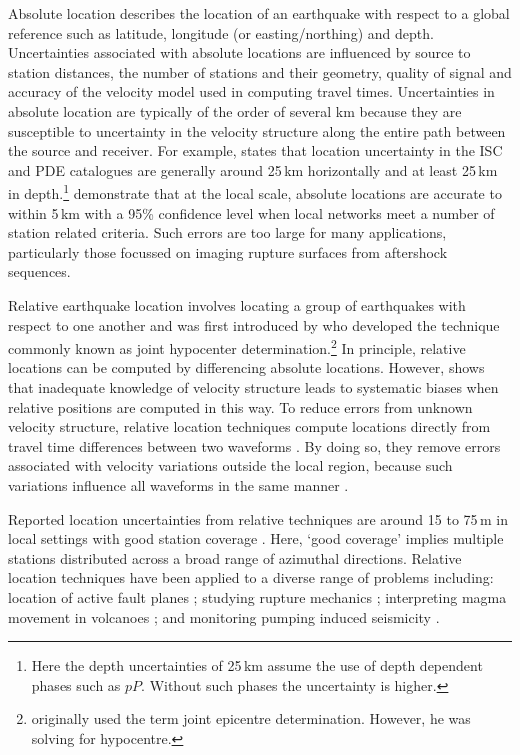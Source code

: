 \documentclass[extra]{gji}
\begin{document}
Absolute location describes the location of an earthquake with
respect to a global reference such as latitude, longitude (or
easting/northing) and depth. Uncertainties associated with absolute
locations are influenced by source to station distances, the number
of stations and their geometry, quality of signal and accuracy of
the velocity model used in computing travel times. Uncertainties in
absolute location are typically of the order of several km because
they are susceptible to uncertainty in the velocity structure along
the entire path between the source and receiver. For example,
\citet{dr_Shearer99a} states that location uncertainty in the ISC
and PDE catalogues are generally around 25\,km horizontally and at
least 25\,km in depth.\footnote{Here the depth uncertainties of
25\,km assume the use of depth dependent phases such as $pP$.
Without such phases the uncertainty is higher.}
\citet{dr_Bondar04a} demonstrate that at the local scale, absolute
locations are accurate to within 5\,km with a 95\% confidence level
when local networks meet a number of station related criteria. Such
errors are too large for many applications, particularly those
focussed on imaging rupture surfaces from aftershock sequences.

Relative earthquake location involves locating a group of
earthquakes with respect to one another and was first introduced by
\citet{dr_Douglas67a} who developed the technique commonly known as
joint hypocenter determination.\footnote{\citet{dr_Douglas67a}
originally used the term joint epicentre determination. However, he
was solving for hypocentre.} In principle, relative locations can be
computed by differencing absolute locations. However,
\citet{dr_Pavlis92a} shows that inadequate knowledge of velocity
structure leads to systematic biases when relative positions are
computed in this way. To reduce errors from unknown velocity
structure, relative location techniques compute locations directly
from travel time differences between two waveforms 
\citep{dr_Ito85a, dr_Got94a, dr_Nadeau97a, dr_Waldhauser99a}. By doing
so, they remove errors associated with velocity variations outside
the local region, because such variations influence all waveforms in
the same manner \citep{dr_Shearer99a}.

Reported location uncertainties from relative techniques are  around
15 to 75\,m in local settings with good station coverage
\citep{dr_Ito85a, dr_Got94a,
dr_Waldhauser99a,dr_Waldhauser08a}. Here, `good coverage' implies
multiple stations distributed across a broad range of azimuthal
directions. Relative location techniques have been applied to a
diverse range of problems including: location of active fault planes
\citep{dr_Deichmann92a, dr_Got94a, dr_Waldhauser99a,
dr_Waldhauser02a, dr_Shearer05a}; studying rupture mechanics
\citep{dr_Rubin99a, dr_Rubin02a}; interpreting magma
movement in volcanoes \citep{dr_Fremont87a}; and
monitoring pumping induced seismicity \citep{dr_Lees98a,
dr_Ake05a}. 
\end{document}
